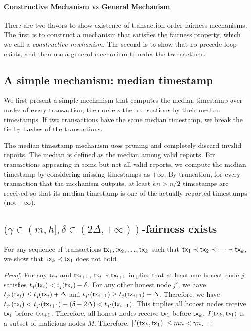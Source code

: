 \documentclass[runningheads]{llncs}
\begin{document}
\paragraph{Constructive Mechanism vs General Mechanism} There are two flavors to show existence of transaction order fairness mechanisms. The first is to construct a mechanism that satisfies the fairness property, which we call a \emph{constructive mechanism}. The second is to show that no precede loop exists, and then use a general mechanism to order the transactions. 

\subsection{A simple mechanism: median timestamp}
We first present a simple mechanism that computes the median timestamp over nodes of every transaction, then orders the transactions by their median timestamps. If two transactions have the same median timestamp, we break the tie by hashes of the transactions. 

The median timestamp mechanism uses pruning and completely discard invalid reports. The median is defined as the median among valid reports. For transactions appearing in some but not all valid reports, we compute the median timestamp by considering missing timestamps as $+\infty$. By truncation, for every transaction that the mechanism outputs, at least $hn>n/2$ timestamps are received so that its median timestamp is one of the actually reported timestamps (not $+\infty$).  

\subsection{$(\gamma\in(m,h], \delta\in(2\Delta,+\infty))$-fairness exists}

For any sequence of transactions $\mathsf{tx}_1, \mathsf{tx}_2, \dots, \mathsf{tx}_k$ such that $\mathsf{tx}_1\prec \mathsf{tx}_2\prec \cdots \prec \mathsf{tx}_k$, we show that $\mathsf{tx}_k \prec \mathsf{tx}_1$ does not hold. 
\begin{proof}
For any $\mathsf{tx}_i$ and $\mathsf{tx}_{i+1}$, $\mathsf{tx}_i\prec \mathsf{tx}_{i+1}$ implies that at least one honest node $j$ satisfies $t_j(\mathsf{tx}_{i}) < t_j(\mathsf{tx}_{i}) - \delta$. For any other honest node $j'$, we have $t_{j'}(\mathsf{tx}_{i}) \le t_j(\mathsf{tx}_{i}) + \Delta$ and $t_{j'}(\mathsf{tx}_{i+1}) \ge t_j(\mathsf{tx}_{i+1}) - \Delta$. Therefore, we have $t_{j'}(\mathsf{tx}_i) < t_{j'}(\mathsf{tx}_{i+1}) - (\delta - 2\Delta) < t_{j'}(\mathsf{tx}_{i+1})$. This implies all honest nodes receive $\mathsf{tx}_{i}$ before $\mathsf{tx}_{i+1}$. Therefore, all honest nodes receive $\mathsf{tx}_{1}$ before $\mathsf{tx}_{k}$. $I(\mathsf{tx}_{k}, \mathsf{tx}_{1})$ is a subset of malicious nodes $M$. Therefore, $|I(\mathsf{tx}_{k}, \mathsf{tx}_{1})|\le mn < \gamma n$. 
\end{proof} 
\end{document}
